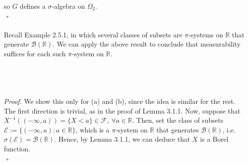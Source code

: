 \documentclass{article}
\begin{document}
so $G$ defines a $\sigma$-algebra on $\Omega_2$. \\ ${}$ \hfill $\square$ \\\\
Recall Example 2.5.1, in which several classes of subsets are $\pi$-systems on $\mathbb{R}$ that generate $\mathcal{B}(\mathbb{R})$. We can apply the above result to conclude that measurability suffices for each such $\pi$-system on $\mathbb{R}$.\\\\
\noindent{}\\\\\\
\textit{Proof.} We show this only for (a) and (b), since the idea is similar for the rest. The first direction is trivial, as in the proof of Lemma 3.1.1. Now, suppose that $X^{-1}((-\infty,a)) = \{X < a\} \in \mathcal{F}, \ \forall a \in \mathbb{R}$. Then, set the class of subsets $\mathcal{E}:=\{(-\infty,a): a \in \mathbb{R}\}$, which is a $\pi$-system on $\mathbb{R}$ that generates $\mathcal{B}(\mathbb{R})$, i.e. $\sigma(\mathcal{E}) = \mathcal{B}(\mathbb{R})$. Hence, by Lemma 3.1.1, we can deduce that $X$ is a Borel function. \\ ${}$ \hfill $\square$
\end{document}
